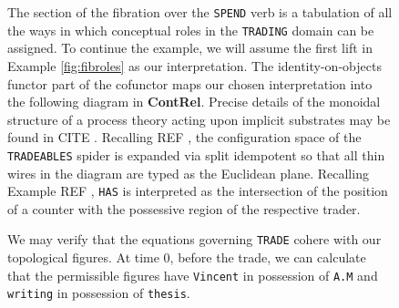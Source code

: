 \begin{example}
\begin{figure}
\end{figure}
\begin{figure}[h]\label{fig:interpret}
\centering
{}
\caption{The section of the fibration over the \texttt{SPEND} verb is a tabulation of all the ways in which conceptual roles in the \texttt{TRADING} domain can be assigned. To continue the example, we will assume the first lift in Example \ref{fig:fibroles} as our interpretation. The identity-on-objects functor part of the cofunctor maps our chosen interpretation into the following diagram in \textbf{ContRel}. Precise details of the monoidal structure of a process theory acting upon implicit substrates may be found in \bR CITE \e. Recalling \bR REF \e, the configuration space of the \texttt{TRADEABLES} spider is expanded via split idempotent so that all thin wires in the diagram are typed as the Euclidean plane. Recalling Example \bR REF \e, \texttt{HAS} is interpreted as the intersection of the position of a counter with the possessive region of the respective trader.}
\end{figure}
\begin{figure}[h]\label{fig:time0}
\centering
{}
\vspace{5cm}
\caption{We may verify that the equations governing \texttt{TRADE} cohere with our topological figures. At time 0, before the trade, we can calculate that the permissible figures have \texttt{Vincent} in possession of \texttt{A.M} and \texttt{writing} in possession of \texttt{thesis}.}

\end{figure}
\end{example}
